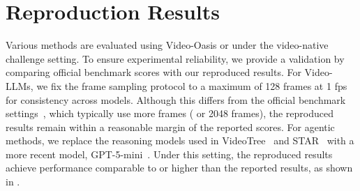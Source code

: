        \clearpage


\section{Reproduction Results} \label{sec:e}

    Various methods are evaluated using Video-Oasis or under the video-native challenge setting. 
    To ensure experimental reliability, we provide a validation by comparing official benchmark scores with our reproduced results.
    For Video-LLMs, we fix the frame sampling protocol to a maximum of 128 frames at 1 fps for consistency across models.
    Although this differs from the official benchmark settings~\cite{eagle25,qwem3_vl,longvilar1}, which typically use more frames ( or 2048 frames), the reproduced results remain within a reasonable margin of the reported scores.
    For agentic methods, we replace the reasoning models used in VideoTree~\cite{videotree} and STAR~\cite{videotool} with a more recent model, GPT-5-mini~\cite{gpt5}.
    Under this setting, the reproduced results achieve performance comparable to or higher than the reported results, as shown in .

